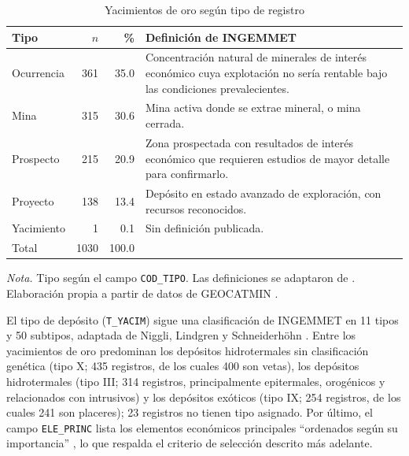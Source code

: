 \documentclass[man,12pt,a4paper,floatsintext,donotrepeattitle]{apa7}
\newcommand{\interlineadosencillo}{\renewcommand{\baselinestretch}{1}\selectfont}
\begin{document}
\begin{table}[htbp]
\caption{Yacimientos de oro según tipo de registro}
\label{tab:tipos}
\centering
\interlineadosencillo
\begin{threeparttable}
\small
\begin{tabular}{@{}lrrp{8.2cm}@{}}
\toprule
Tipo & $n$ & \% & Definición de INGEMMET \\
\midrule
Ocurrencia & 361 & 35.0 & Concentración natural de minerales de interés
económico cuya explotación no sería rentable bajo las condiciones
prevalecientes. \\
Mina & 315 & 30.6 & Mina activa donde se extrae mineral, o mina cerrada. \\
Prospecto & 215 & 20.9 & Zona prospectada con resultados de interés
económico que requieren estudios de mayor detalle para confirmarlo. \\
Proyecto & 138 & 13.4 & Depósito en estado avanzado de exploración, con
recursos reconocidos. \\
Yacimiento & 1 & 0.1 & Sin definición publicada. \\
\midrule
Total & 1030 & 100.0 & \\
\bottomrule
\end{tabular}
\vspace{6pt}
\begin{tablenotes}[flushleft]
\small
\item \textit{Nota.} Tipo según el campo \texttt{COD\_TIPO}. Las definiciones
se adaptaron de \textcite{huanacuni2010guia}. Elaboración propia a partir de datos
de GEOCATMIN \parencite{ingemmet2026}.
\end{tablenotes}
\end{threeparttable}
\end{table}

El tipo de depósito (\texttt{T\_YACIM}) sigue una clasificación de INGEMMET en
11 tipos y 50 subtipos, adaptada de Niggli, Lindgren y Schneiderhöhn
\parencite{huanacuni2010guia}. Entre los yacimientos de oro predominan los
depósitos hidrotermales sin clasificación genética (tipo X; 435 registros, de
los cuales 400 son vetas), los depósitos hidrotermales (tipo III; 314 registros,
principalmente epitermales, orogénicos y relacionados con intrusivos) y los
depósitos exóticos (tipo IX; 254 registros, de los cuales 241 son placeres); 23
registros no tienen tipo asignado. Por último, el campo \texttt{ELE\_PRINC} lista
los elementos económicos principales ``ordenados según su importancia''
\parencite{ingemmet2026servicio}, lo que respalda el criterio de selección
descrito más adelante.
\end{document}
